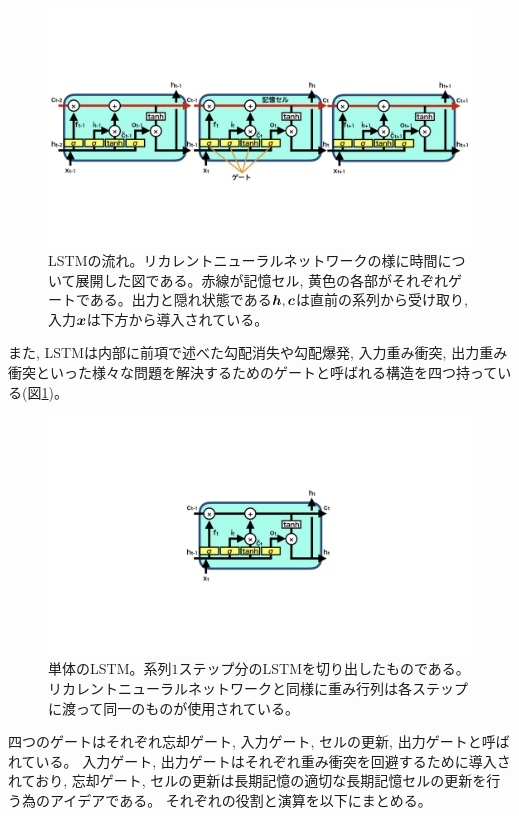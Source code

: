 \begin{figure}[htbp]
 \centering
 \includegraphics[trim = 0 200 0 200, width=1.0\textwidth, clip]{Figure/2DeepLearning/10LongShortTermMemory.png}
 \caption[LSTMの流れ]{LSTMの流れ。リカレントニューラルネットワークの様に時間について展開した図である。赤線が記憶セル, 黄色の各部がそれぞれゲートである。出力と隠れ状態である${\mbox{\boldmath{$h$}}},{\mbox{\boldmath{$c$}}}$は直前の系列から受け取り, 入力${\mbox{\boldmath{$x$}}}$は下方から導入されている。}
 \label{10LongShortTermMemory}
\end{figure}

また, LSTMは内部に前項で述べた勾配消失や勾配爆発, 入力重み衝突, 出力重み衝突といった様々な問題を解決するためのゲートと呼ばれる構造を四つ持っている(図\ref{10LongShortTermMemory})。

\begin{figure}[htbp]
 \centering
 \includegraphics[trim = 0 300 0 300, width=1.0\textwidth, clip]{Figure/2DeepLearning/11LSTM.png}
 \caption[単体のLSTM]{単体のLSTM。系列$1$ステップ分のLSTMを切り出したものである。リカレントニューラルネットワークと同様に重み行列は各ステップに渡って同一のものが使用されている。}
 \label{11LSTM}
\end{figure}
\newpage
四つのゲートはそれぞれ忘却ゲート, 入力ゲート, セルの更新, 出力ゲートと呼ばれている。
入力ゲート, 出力ゲートはそれぞれ重み衝突を回避するために導入されており, 忘却ゲート, セルの更新は長期記憶の適切な長期記憶セルの更新を行う為のアイデアである。
それぞれの役割と演算を以下にまとめる。

